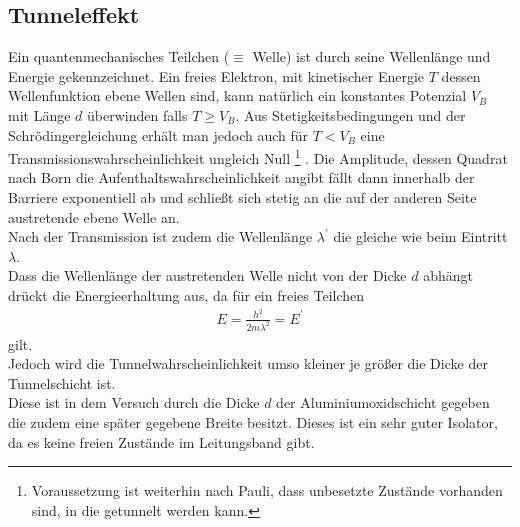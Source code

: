 \documentclass[twoside,        %
               BCOR12mm,       %
               english,ngerman, %
               fleqn,headsepline=false,footsepline=false
              ]{MFPREPORT}
\begin{document}
\subsection{Tunneleffekt}
Ein quantenmechanisches Teilchen ($\equiv$ Welle) ist durch seine Wellenlänge und Energie gekennzeichnet. 
Ein freies Elektron, mit kinetischer Energie $T$ dessen Wellenfunktion ebene Wellen sind, kann natürlich ein konstantes Potenzial $V_{B}$ mit Länge $d$ überwinden falls $T \geq V_{B}$.
Aus Stetigkeitsbedingungen und der Schrödingergleichung erhält man jedoch auch für $T < V_{B}$ eine Transmissionswahrscheinlichkeit ungleich Null
\footnote{Voraussetzung ist weiterhin nach Pauli, dass unbesetzte Zustände vorhanden sind, in die getunnelt werden kann.} .
Die Amplitude, dessen Quadrat nach Born die Aufenthaltswahrscheinlichkeit angibt fällt dann innerhalb der Barriere exponentiell ab und schließt sich stetig an die auf der anderen Seite austretende ebene Welle an.
\\
Nach der Transmission ist zudem die Wellenlänge $\lambda^{\prime}$ die gleiche wie beim Eintritt $\lambda$.
\\
Dass die Wellenlänge der austretenden Welle nicht von der Dicke $d$ abhängt drückt die Energieerhaltung aus,
da für ein freies Teilchen
\begin{align}
E = \frac{h^2}{2 m \lambda^2} = E^{\prime}
\end{align}
gilt.
\\
Jedoch wird die Tunnelwahrscheinlichkeit umso kleiner je größer die Dicke der Tunnelschicht ist.
\\
Diese ist in dem Versuch durch die Dicke $d$ der Aluminiumoxidschicht gegeben die zudem eine später gegebene Breite besitzt.
Dieses ist ein sehr guter Isolator, da es keine freien Zustände im Leitungsband gibt.
\end{document}
